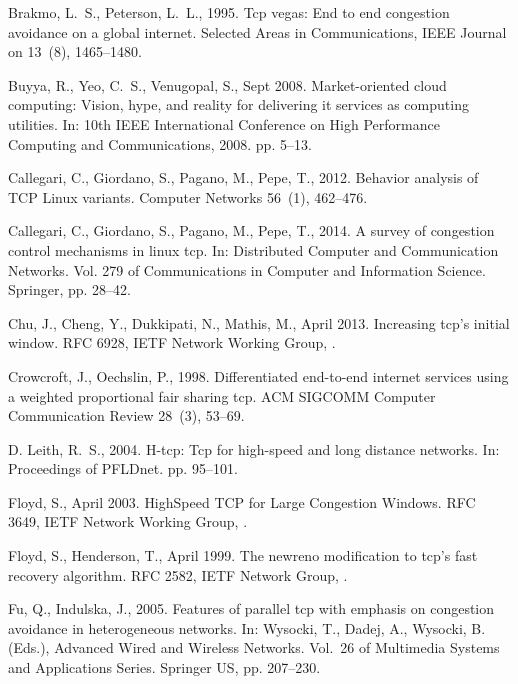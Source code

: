 \documentclass[preprint,3p,times,twocolumn,authoryear]{elsarticle}
\begin{document}
\begin{thebibliography}{46}
Brakmo, L.~S., Peterson, L.~L., 1995. Tcp vegas: End to end congestion
  avoidance on a global internet. Selected Areas in Communications, IEEE
  Journal on 13~(8), 1465--1480.

Buyya, R., Yeo, C.~S., Venugopal, S., Sept 2008. Market-oriented cloud
  computing: Vision, hype, and reality for delivering it services as computing
  utilities. In: 10th IEEE International Conference on High Performance
  Computing and Communications, 2008. pp. 5--13.

Callegari, C., Giordano, S., Pagano, M., Pepe, T., 2012. {Behavior analysis of
  TCP Linux variants}. Computer Networks 56~(1), 462--476.

Callegari, C., Giordano, S., Pagano, M., Pepe, T., 2014. A survey of congestion
  control mechanisms in linux tcp. In: Distributed Computer and Communication
  Networks. Vol. 279 of Communications in Computer and Information Science.
  Springer, pp. 28--42.

Chu, J., Cheng, Y., Dukkipati, N., Mathis, M., April 2013. Increasing tcp's
  initial window. RFC 6928, IETF Network Working Group, .

Crowcroft, J., Oechslin, P., 1998. Differentiated end-to-end internet services
  using a weighted proportional fair sharing tcp. ACM SIGCOMM Computer
  Communication Review 28~(3), 53--69.

{D. Leith}, R.~S., 2004. H-tcp: Tcp for high-speed and long distance networks.
  In: Proceedings of PFLDnet. pp. 95--101.

Floyd, S., April 2003. {HighSpeed TCP for Large Congestion Windows}. RFC 3649,
  IETF Network Working Group, .

Floyd, S., Henderson, T., April 1999. The newreno modification to tcp’s fast
  recovery algorithm. RFC 2582, IETF Network Group, .

Fu, Q., Indulska, J., 2005. Features of parallel tcp with emphasis on
  congestion avoidance in heterogeneous networks. In: Wysocki, T., Dadej, A.,
  Wysocki, B. (Eds.), Advanced Wired and Wireless Networks. Vol.~26 of
  Multimedia Systems and Applications Series. Springer US, pp. 207--230.


\end{thebibliography}
\end{document}
